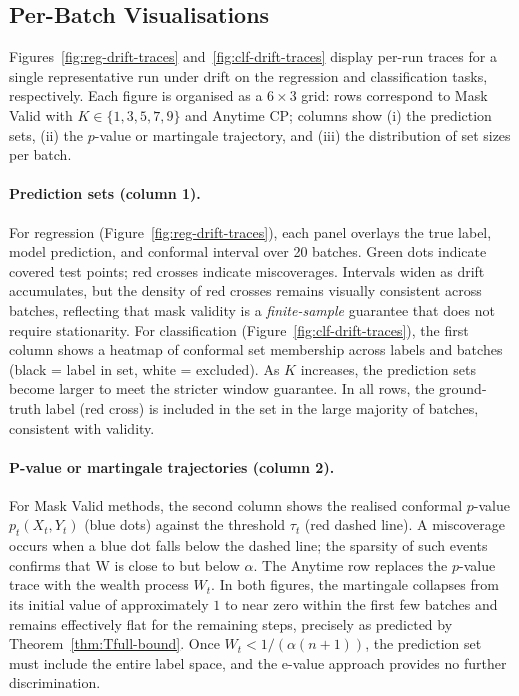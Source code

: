 \documentclass{uai2026} %
\newcommand{\1}{\mathbf{1}}
\begin{document}
\subsection{Per-Batch Visualisations}
\label{app:figures}

Figures~\ref{fig:reg-drift-traces} and~\ref{fig:clf-drift-traces} display per-run traces for a single representative run under drift on the regression and classification tasks, respectively.
Each figure is organised as a $6{\times}3$ grid: rows correspond to Mask Valid with $K\in\{1,3,5,7,9\}$ and Anytime CP; columns show (i) the prediction sets, (ii) the $p$-value or martingale trajectory, and (iii) the distribution of set sizes per batch.

\paragraph{Prediction sets (column 1).}
For regression (Figure~\ref{fig:reg-drift-traces}), each panel overlays the true label, model prediction, and conformal interval over 20 batches.
Green dots indicate covered test points; red crosses indicate miscoverages.
Intervals widen as drift accumulates, but the density of red crosses remains visually consistent across batches, reflecting that mask validity is a \emph{finite-sample} guarantee that does not require stationarity.
For classification (Figure~\ref{fig:clf-drift-traces}), the first column shows a heatmap of conformal set membership across labels and batches (black = label in set, white = excluded).
As $K$ increases, the prediction sets become larger to meet the stricter window guarantee.
In all rows, the ground-truth label (red cross) is included in the set in the large majority of batches, consistent with validity.

\paragraph{P-value or martingale trajectories (column 2).}
For Mask Valid methods, the second column shows the realised conformal $p$-value $p_t(X_t, Y_t)$ (blue dots) against the threshold $\tau_t$ (red dashed line).
A miscoverage occurs when a blue dot falls below the dashed line; the sparsity of such events confirms that W is close to but below $\alpha$.
The Anytime row replaces the $p$-value trace with the wealth process $W_t$.
In both figures, the martingale collapses from its initial value of approximately $1$ to near zero within the first few batches and remains effectively flat for the remaining steps, precisely as predicted by Theorem~\ref{thm:Tfull-bound}.
Once $W_t < 1/(\alpha(n{+}1))$, the prediction set must include the entire label space, and the e-value approach provides no further discrimination.
\end{document}
